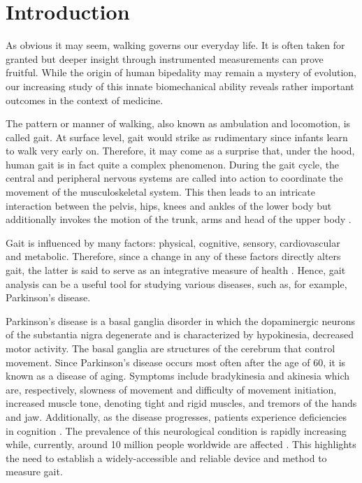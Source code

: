 
\section{Introduction}

As obvious it may seem, walking governs our everyday life. It is often taken for granted but deeper insight through instrumented measurements can prove fruitful. While the origin of human bipedality may remain a mystery of evolution, our increasing study of this innate biomechanical ability reveals rather important outcomes in the context of medicine. 

The pattern or manner of walking, also known as ambulation and locomotion, is called gait. At surface level, gait would strike as rudimentary since infants learn to walk very early on. Therefore, it may come as a surprise that, under the hood, human gait is in fact quite a complex phenomenon. During the gait cycle, the central and peripheral nervous systems are called into action to coordinate the movement of the musculoskeletal system. This then leads to an intricate interaction between the pelvis, hips, knees and ankles of the lower body but additionally invokes the motion of the trunk, arms and head of the upper body \cite{webster_principles_2019}.

Gait is influenced by many factors: physical, cognitive, sensory, cardiovascular and metabolic. Therefore, since a change in any of these factors directly alters gait, the latter is said to serve as an integrative measure of health \cite{lebrasseur_gait_2019}. Hence, gait analysis can be a useful tool for studying various diseases, such as, for example, Parkinson's disease.

Parkinson's disease is a basal ganglia disorder in which the dopaminergic neurons of the substantia nigra degenerate and is characterized by hypokinesia, decreased motor activity. The basal ganglia are structures of the cerebrum that control movement. Since Parkinson's disease occurs most often after the age of 60, it is known as a disease of aging. Symptoms include bradykinesia and akinesia which are, respectively, slowness of movement and difficulty of movement initiation, increased muscle tone, denoting tight and rigid muscles, and tremors of the hands and jaw. Additionally, as the disease progresses, patients experience deficiencies in cognition \cite{bear_neuroscience_2016}. The prevalence of this neurological condition is rapidly increasing while, currently, around 10 million people worldwide are affected \cite{noauthor_what_nodate}. This highlights the need to establish a widely-accessible and reliable device and method to measure gait.

